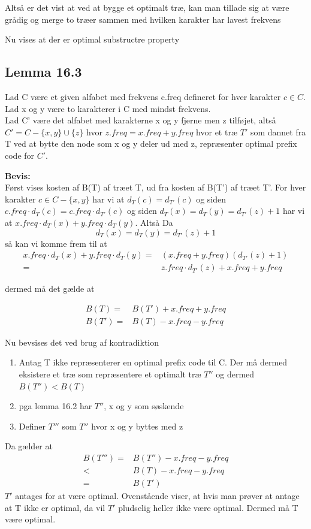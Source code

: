 \documentclass[11pt,a4paper]{report}
\theoremstyle{plain}
\theoremstyle{definition}
\theoremstyle{remark}
\numberwithin{equation}{section}
\begin{document}
Altså er det vist at ved at bygge et optimalt træ, kan man tillade sig at være grådig og merge to træer sammen med hvilken karakter har lavest frekvens

Nu vises at der er optimal substructre property

\subsection{Lemma 16.3}
Lad C være et given alfabet med frekvens c.freq defineret for hver karakter $c \in C$. Lad x og y være to karakterer i C med mindst frekvens.\\
Lad C' være det alfabet med karakterne x og y fjerne men z tilføjet, altså $C' = C - \{x,y\} \cup \{z\}$ hvor $z.freq = x.freq + y.freq$ hvor et træ $T'$ som dannet fra T ved at bytte den node som x og y deler ud med z, repræsenter optimal prefix code for $C'$.

\textbf{Bevis:}\\
Først vises kosten af B(T) af træet T, ud fra kosten af B(T') af træet T'. For hver karakter $c \in C - \{x,y\}$ har vi at $d_T(c) = d_{T'}(c)$ og siden $c.freq \cdot d_T(c) = c.freq \cdot d_{T'}(c)$ og siden $d_T(x) = d_T(y) = d_{T'}(z) +1$ har vi at $x.freq \cdot d_T(x) +y.freq\cdot d_T(y)$. Altså
Da
\[
d_T(x) = d_T(y) = d_{T'}(z) +1
\]
så kan vi komme frem til at
\begin{align*}
  x.freq \cdot d_T(x) + y.freq \cdot d_T(y) = & (x.freq + y.freq)(d_{T'}(z) +1) \\
  =& z.freq \cdot d_{T'}(z) + x.freq + y.freq
\end{align*}

dermed må det gælde at

\begin{align*}
  B(T)  =& B(T') + x.freq + y.freq \\
  B(T') =& B(T) - x.freq - y.freq
\end{align*}

Nu bevsises det ved brug af kontradiktion

\begin{enumerate}
  \item Antag T ikke repræsenterer en optimal prefix code til C. Der må dermed eksistere et træ som repræsentere et optimalt træ $T''$ og dermed $B(T'') < B(T)$
  \item pga lemma 16.2 har $T''$, x og y som søskende
  \item Definer $T'''$ som $T''$ hvor x og y byttes med z
\end{enumerate}
Da gælder at
\begin{align*}
  B(T''') =& B(T'') - x.freq - y.freq \\
  < & B(T) - x.freq - y.freq \\
  = & B(T')
\end{align*}
$T'$ antages for at være optimal. Ovenstående viser, at hvis man prøver at antage at T ikke er optimal, da vil $T'$ pludselig heller ikke være optimal. Dermed må T være optimal.
\end{document}
